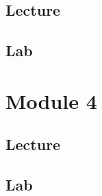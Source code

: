 \documentclass[
]{book}
\begin{document}
\section{Lecture}\label{lecture-2}

\section{Lab}\label{lab-2}

\chapter{Module 4}\label{module-4}

\section{Lecture}\label{lecture-3}

\section{Lab}\label{lab-3}

  
\end{document}
